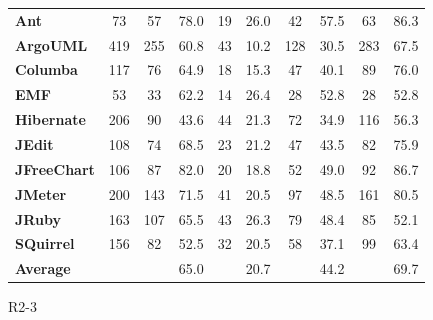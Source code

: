 {\begin{table}[!thb]
\begin{center}
\begin{tabular}{l| c c c c c c c c c}
        \textbf{Ant}            & 73  & 57   & 78.0  & 19 & 26.0  & 42  & 57.5 & 63  & 86.3   \\
        \textbf{ArgoUML}        & 419 & 255  & 60.8  & 43 & 10.2  & 128 & 30.5 & 283 & 67.5   \\
        \textbf{Columba}        & 117 & 76   & 64.9  & 18 & 15.3  & 47  & 40.1 & 89  & 76.0   \\
        \textbf{EMF}            & 53  & 33   & 62.2  & 14 & 26.4  & 28  & 52.8 & 28  & 52.8   \\
        \textbf{Hibernate}      & 206 & 90   & 43.6  & 44 & 21.3  & 72  & 34.9 & 116 & 56.3   \\
        \textbf{JEdit}          & 108 & 74   & 68.5  & 23 & 21.2  & 47  & 43.5 & 82  & 75.9   \\
        \textbf{JFreeChart}     & 106 & 87   & 82.0  & 20 & 18.8  & 52  & 49.0 & 92  & 86.7   \\
        \textbf{JMeter}         & 200 & 143  & 71.5  & 41 & 20.5  & 97  & 48.5 & 161 & 80.5   \\
        \textbf{JRuby}          & 163 & 107  & 65.5  & 43 & 26.3  & 79  & 48.4 & 85  & 52.1   \\
        \textbf{SQuirrel}       & 156 & 82   & 52.5  & 32 & 20.5  & 58  & 37.1 & 99  & 63.4   \\
        \midrule
        \textbf{Average}        &     &      & 65.0  &    & 20.7  &     & 44.2 &     & 69.7  \\

        \bottomrule
        \end{tabular}
    \end{center}
\end{table} 

}{R2-3}